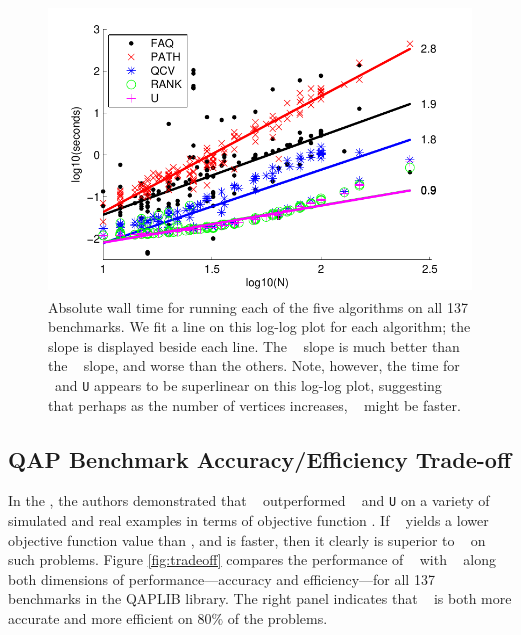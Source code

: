 \documentclass[preprint,11pt]{elsarticle}
\begin{document}
\begin{figure}[htbp]
	\centering
		\includegraphics[height=3in]{allEfficiency.pdf}
	\caption{Absolute wall time for running each of the five algorithms on all 137 benchmarks. We fit a line on this log-log plot for each algorithm; the slope is displayed beside each line. The \FAQ~ slope is much better than the \Path~ slope, and worse than the others.  Note, however, the time for \Rank~and \texttt{U} appears to be superlinear on this log-log plot, suggesting that perhaps as the number of vertices increases, \Path~ might be faster. }
	\label{fig:allEfficiency}
\end{figure}



\subsection{QAP Benchmark Accuracy/Efficiency Trade-off} %
\label{sub:tradeoff}


In the \Path, the authors demonstrated that \Path~ outperformed \Qcv~ and \texttt{U} on a variety of simulated and real examples in terms of objective function \cite{Zaslavskiy2009}.  If \FAQ~ yields a lower objective function value than \FAQ, and is faster, then it clearly is superior to \Path~ on such problems.  Figure \ref{fig:tradeoff} compares the performance of \FAQ~ with \Path~ along both dimensions of performance---accuracy and efficiency---for all 137 benchmarks in the QAPLIB library.  The right panel indicates that \FAQ~ is both more accurate and more efficient on $80\%$ of the problems.
\end{document}
